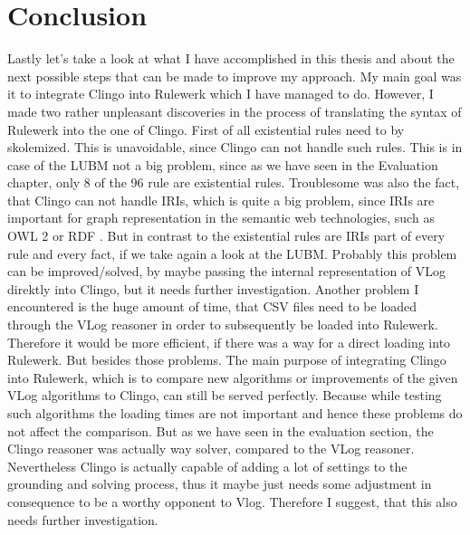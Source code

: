 \documentclass[hyperref, bachelorofscience]{cgvpub}
\begin{document}
\chapter{Conclusion}
Lastly let's take a look at what I have accomplished in this thesis and about the next possible steps that can
be made to improve my approach. My main goal was it to integrate Clingo into Rulewerk which I have
managed to do. However, I made two rather unpleasant discoveries in the process of translating the syntax
of Rulewerk into the one of Clingo. First of all existential rules need to by skolemized. This is unavoidable, since Clingo can not handle such rules. This is in case of the LUBM not a big problem, since as we have seen in the Evaluation chapter, only 8 of the 96 rule are existential rules. Troublesome was also the fact,
that Clingo can not handle IRIs, which is quite a big problem, since IRIs are important for graph
representation in the semantic web technologies, such as OWL 2 \cite{MPSPBFHHIRSS2012} or RDF \cite{PCBT2014}. But in contrast to the existential rules are IRIs part of every rule and every fact, if we take again a look at the LUBM. Probably this problem can be
improved/solved, by maybe passing the internal representation of VLog direktly into Clingo, but it needs further investigation. Another problem I encountered is the
huge amount of time, that CSV files need to be loaded through the VLog reasoner in order to subsequently be
loaded into Rulewerk. Therefore it would be more efficient, if there was a way for a direct loading into Rulewerk. But besides those problems. The main purpose of integrating Clingo into Rulewerk, which is to
compare new algorithms or improvements of the given VLog algorithms to Clingo, can still be served perfectly.
Because while testing such algorithms the loading times are not important and hence these problems do not
affect the comparison. But as we have seen in the evaluation section, the Clingo reasoner was actually way
solver, compared to the VLog reasoner. Nevertheless Clingo is actually capable of adding a lot
of settings to the grounding and solving process, thus it maybe just needs some adjustment in consequence to
be a worthy opponent to Vlog. Therefore I suggest, that this also needs further investigation.



\end{document}
